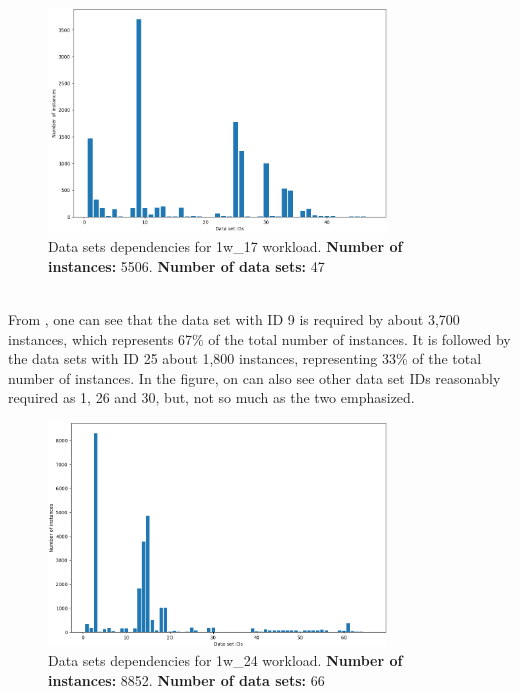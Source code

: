 \begin{figure} [H]
    \centering
    \includegraphics[width=0.8\textwidth]{images/experiments/datasets/1w_17-05-2019_data_sets_dependencies.png}
    \captionsetup{justification=centering,margin=3cm}
    \caption{Data sets dependencies for 1w\_17 workload. \textbf{Number of instances:} 5506. \textbf{Number of data sets:} 47}
    \label{fig:datasets-dependencies-1w_17}
\end{figure}

\\

From , one can see that the data set with ID 9 is required by about 3,700 instances, which represents 67\% of the total number of instances. It is followed by the data sets with ID 25 about 1,800 instances, representing 33\% of the total number of instances. In the figure, on can also see other data set IDs reasonably required as 1, 26 and 30, but, not so much as the two emphasized. \\

\begin{figure} [H]
    \centering
    \includegraphics[width=0.8\textwidth]{images/experiments/datasets/1w_24-05-2019_data_sets_dependencies.png}
    \captionsetup{justification=centering,margin=3cm}
    \caption{Data sets dependencies for 1w\_24 workload. \textbf{Number of instances:} 8852. \textbf{Number of data sets:} 66}
    \label{fig:datasets-dependencies-1w_24}
\end{figure}

